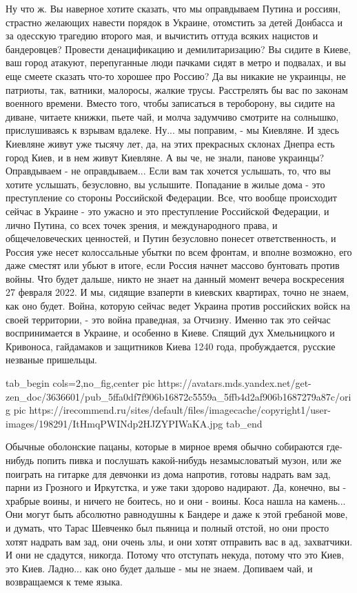 Ну что ж. Вы наверное хотите сказать, что мы оправдываем Путина и россиян,
страстно желающих навести порядок в Украине, отомстить за детей Донбасса и за
одесскую трагедию второго мая, и вычистить оттуда всяких нацистов и
бандеровцев? Провести денацификацию и демилитаризацию? Вы сидите в Киеве, ваш
город атакуют, перепуганные люди пачками сидят в метро и подвалах, и вы еще
смеете сказать что-то хорошее про Россию? Да вы никакие не украинцы, не
патриоты, так, ватники, малоросы, жалкие трусы. Расстрелять бы вас по законам
военного времени. Вместо того, чтобы записаться в тероборону, вы сидите на
диване, читаете книжки, пьете чай, и молча задумчиво смотрите на солнышко,
прислушиваясь к взрывам вдалеке.  Ну...  мы поправим, - мы Киевляне.  И здесь
Киевляне живут уже тысячу лет, да, на этих прекрасных склонах Днепра есть город
Киев, и в нем живут Киевляне.  А вы че, не знали, панове украинцы?  Оправдываем
- не оправдываем... Если вам так хочется услышать, то, что вы хотите услышать,
безусловно, вы услышите.  Попадание в жилые дома - это преступление со стороны
Российской Федерации.  Все, что вообще происходит сейчас в Украине - это ужасно
и это преступление Российской Федерации, и лично Путина, со всех точек зрения,
и международного права, и общечеловеческих ценностей, и Путин безусловно
понесет ответственность, и Россия уже несет колоссальные убытки по всем
фронтам, и вполне возможно, его даже сместят или убьют в итоге, если Россия
начнет массово бунтовать против войны. Что будет дальше, никто не знает на
данный момент вечера воскресения 27 февраля 2022. И мы, сидящие взаперти в
киевских квартирах, точно не знаем, как оно будет. Война, которую сейчас ведет
Украина против российских войск на своей территории, - это война праведная, за
Отчизну. Именно так это сейчас воспринимается в Украине, и особенно в Киеве.
Спящий дух Хмельницкого и Кривоноса, гайдамаков и защитников Киева 1240 года,
пробуждается, русские незваные пришельцы. 

\ifcmt
  tab_begin cols=2,no_fig,center
     pic https://avatars.mds.yandex.net/get-zen_doc/3636601/pub_5ffa0df7f906b16872c5559a_5ffb4d2af906b1687279a87c/orig
     pic https://irecommend.ru/sites/default/files/imagecache/copyright1/user-images/198291/ItHmqPWINdp2HJZYPIWaKA.jpg
  tab_end
\fi

Обычные оболонские пацаны, которые в мирное время обычно собираются где-нибудь
попить пивка и послушать какой-нибудь незамысловатый музон, или же поиграть на
гитарке для девчонки из дома напротив, готовы надрать вам зад, парни из
Грозного и Иркутстка, и уже таки здорово надирают. Да, конечно, вы - храбрые
воины, и ничего не боитесь, но и они - воины.  Коса нашла на камень...  Они
могут быть абсолютно равнодушны к Бандере и даже к этой гребаной мове, и
думать, что Тарас Шевченко был пьяница и полный отстой, но они просто хотят
надрать вам зад, они очень злы, и они хотят отправить вас в ад, захватчики. И
они не сдадутся, никогда. Потому что отступать некуда, потому что это Киев, это
Киев. Ладно... как оно будет дальше - мы не знаем. Допиваем чай, и возвращаемся
к теме языка.

